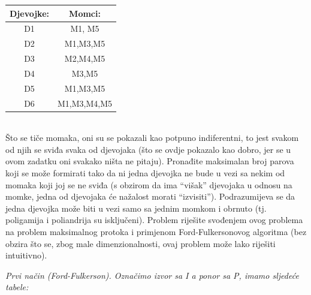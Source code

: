 \documentclass[12pt]{article}
\begin{document}
\begin{enumerate}
\begin{tabular}{|c|c|}
\hline
Djevojke: & Momci: \\ \hline
D1 & M1, M5 \\ \hline
D2 & M1,M3,M5 \\ \hline
D3 & M2,M4,M5 \\ \hline
D4 & M3,M5 \\ \hline
D5 & M1,M3,M5 \\ \hline
D6 & M1,M3,M4,M5 \\ \hline
\end{tabular}
\\
     Što se tiče momaka, oni su se pokazali kao potpuno indiferentni, to jest svakom od njih se sviđa svaka od djevojaka (što se ovdje pokazalo kao dobro, jer se u ovom zadatku oni svakako ništa ne pitaju). Pronađite maksimalan broj parova koji se može formirati tako da ni jedna djevojka ne bude u vezi sa nekim od momaka koji joj se ne sviđa (s obzirom da ima “višak” djevojaka u odnosu na momke, jedna od djevojaka će nažalost morati “izvisiti”). Podrazumijeva se da jedna djevojka može biti u vezi samo sa jednim momkom i obrnuto (tj. poligamija i poliandrija su isključeni). Problem riješite svođenjem ovog problema na problem maksimalnog protoka i primjenom Ford-Fulkersonovog algoritma (bez obzira što se, zbog male dimenzionalnosti, ovaj problem može lako riješiti intuitivno).
     \newpage
     \begin{center}
     
     \textit{Prvi način (Ford-Fulkerson). Označimo izvor sa I a ponor sa P, imamo sljedeće tabele:\\}
     \vspace{0.3cm}


\end{center}
\end{enumerate}
\end{document}

